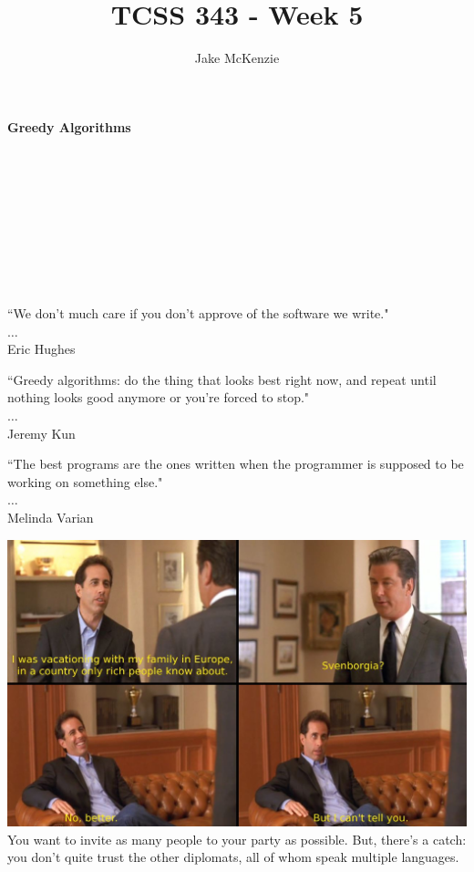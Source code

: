 \documentclass[12pt]{article}
\begin{document}
\title{TCSS 343 - Week 5}
\author{Jake McKenzie}
\maketitle
\noindent\centerline{\textbf{Greedy Algorithms}}\\\\\\\\\\\\\\\\
\begin{center}
    ``We don't much care if you don't approve of the software we write." \\$\dots$\\ Eric Hughes
\end{center}
\begin{center}
    ``Greedy algorithms: do the thing that looks best right now, and repeat until nothing looks good anymore or you're forced to stop." \\$\dots$\\ Jeremy Kun
\end{center}
\begin{center}
    ``The best programs are the ones written when the programmer is supposed to be working on something else." \\$\dots$\\ Melinda Varian
\end{center}
\newpage
\includegraphics[width=\textwidth]{svenborgia.jpg}\\
\noindent You want to invite as many people to your party as possible. 
But, there’s a catch: you don’t quite trust the
other diplomats, all of whom speak multiple languages. 
\end{document}
